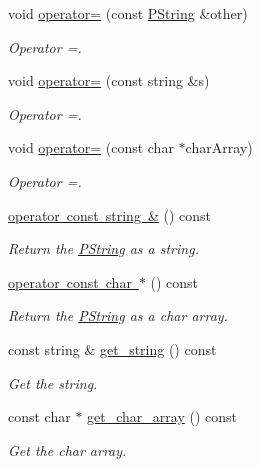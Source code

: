 \begin{DoxyCompactItemize}
void \mbox{\hyperlink{classprz_1_1_p_string_af11c712191376d1a520d9f6fec1043f1}{operator=}} (const \mbox{\hyperlink{classprz_1_1_p_string}{P\+String}} \&other)
\begin{DoxyCompactList}\small\item\em Operator =. \end{DoxyCompactList}\item 
void \mbox{\hyperlink{classprz_1_1_p_string_a35a75dce51e36e533fcb764b7b526f43}{operator=}} (const string \&s)
\begin{DoxyCompactList}\small\item\em Operator =. \end{DoxyCompactList}\item 
void \mbox{\hyperlink{classprz_1_1_p_string_a01b27436f489b3e768a3c3eaa526d3b5}{operator=}} (const char $\ast$char\+Array)
\begin{DoxyCompactList}\small\item\em Operator =. \end{DoxyCompactList}\item 
\mbox{\hyperlink{classprz_1_1_p_string_a4850462b0184e2ed268f709b695b10c3}{operator const string \&}} () const
\begin{DoxyCompactList}\small\item\em Return the \mbox{\hyperlink{classprz_1_1_p_string}{P\+String}} as a string. \end{DoxyCompactList}\item 
\mbox{\hyperlink{classprz_1_1_p_string_a05c5e08761cab3f57c956130f526dc8b}{operator const char $\ast$}} () const
\begin{DoxyCompactList}\small\item\em Return the \mbox{\hyperlink{classprz_1_1_p_string}{P\+String}} as a char array. \end{DoxyCompactList}\item 
const string \& \mbox{\hyperlink{classprz_1_1_p_string_aace77edbeea5e61da3a03aa667fa6259}{get\+\_\+string}} () const
\begin{DoxyCompactList}\small\item\em Get the string. \end{DoxyCompactList}\item 
const char $\ast$ \mbox{\hyperlink{classprz_1_1_p_string_af7507e210bb80e4cd2f8bbf3e881de99}{get\+\_\+char\+\_\+array}} () const
\begin{DoxyCompactList}\small\item\em Get the char array. \end{DoxyCompactList}\end{DoxyCompactItemize}


